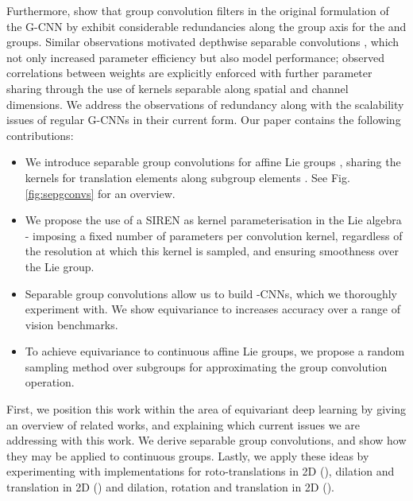 \documentclass[nohyperref]{article}
\theoremstyle{plain}
\theoremstyle{definition}
\theoremstyle{remark}
\begin{document}
Furthermore, \citet{lengyel2021exploiting} show that group convolution filters in the original formulation of the G-CNN by \citet{cohen2016group} exhibit considerable redundancies along the group axis for the  and  groups. Similar observations motivated depthwise separable convolutions \citep{chollet2017xception}, which not only increased parameter efficiency but also model performance; observed correlations between weights are explicitly enforced with further parameter sharing through the use of kernels separable along spatial and channel dimensions. We address the observations of redundancy along with the scalability issues of regular G-CNNs in their current form. Our paper contains the following contributions:
\begin{itemize}[topsep=0pt,itemsep=-1pt, leftmargin=0.5cm]
    \item We introduce separable group convolutions for affine Lie groups , sharing the kernels for translation elements  along subgroup elements . See Fig. \ref{fig:sepgconvs} for an overview.
    \item We propose the use of a SIREN \citep{sitzmann2020implicit} as kernel parameterisation in the Lie algebra - imposing a fixed number of parameters per convolution kernel, regardless of the resolution at which this kernel is sampled, and ensuring smoothness over the Lie group.
    \item  Separable group convolutions allow us to build -CNNs, which we thoroughly experiment with. We show equivariance to  increases accuracy over a range of vision benchmarks.
    \item To achieve equivariance to continuous affine Lie groups, we propose a random sampling method over subgroups  for approximating the group convolution operation.
\end{itemize}
First, we position this work within the area of equivariant deep learning by giving an overview of related works, and explaining which current issues we are addressing with this work.
We derive separable group convolutions, and show how they may be applied to continuous groups. Lastly, we apply these ideas by experimenting with implementations for roto-translations in 2D (), dilation and translation in 2D () and dilation, rotation and translation in 2D (). 
\end{document}
